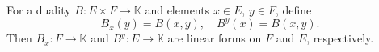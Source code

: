 For a duality $B: E \times F \to \mathbb{K}$ and elements $x \in E$, $y \in F$, define
$$B_x(y) = B(x, y), \quad B^y(x) = B(x, y).$$
Then $B_x: F \to \mathbb{K}$ and $B^y: E \to \mathbb{K}$ are linear forms on $F$ and $E$, respectively.
